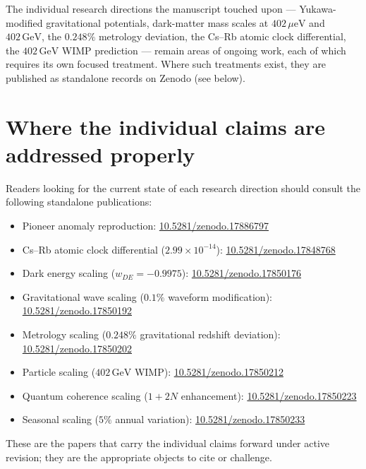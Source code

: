 \documentclass[11pt,a4paper]{article}
\begin{document}
The individual research directions the manuscript touched upon --- Yukawa-modified gravitational potentials, dark-matter mass scales at $402\,\mu\text{eV}$ and $402\,\text{GeV}$, the $0.248\%$ metrology deviation, the Cs--Rb atomic clock differential, the $402\,\text{GeV}$ WIMP prediction --- remain areas of ongoing work, each of which requires its own focused treatment. Where such treatments exist, they are published as standalone records on Zenodo (see below).

\section*{Where the individual claims are addressed properly}

Readers looking for the current state of each research direction should consult the following standalone publications:

\begin{itemize}
    \item Pioneer anomaly reproduction: \href{https://doi.org/10.5281/zenodo.17886797}{10.5281/zenodo.17886797}
    \item Cs--Rb atomic clock differential ($2.99\times 10^{-14}$): \href{https://doi.org/10.5281/zenodo.17848768}{10.5281/zenodo.17848768}
    \item Dark energy scaling ($w_{DE} = -0.9975$): \href{https://doi.org/10.5281/zenodo.17850176}{10.5281/zenodo.17850176}
    \item Gravitational wave scaling ($0.1\%$ waveform modification): \href{https://doi.org/10.5281/zenodo.17850192}{10.5281/zenodo.17850192}
    \item Metrology scaling ($0.248\%$ gravitational redshift deviation): \href{https://doi.org/10.5281/zenodo.17850202}{10.5281/zenodo.17850202}
    \item Particle scaling ($402\,\text{GeV}$ WIMP): \href{https://doi.org/10.5281/zenodo.17850212}{10.5281/zenodo.17850212}
    \item Quantum coherence scaling ($1+2N$ enhancement): \href{https://doi.org/10.5281/zenodo.17850223}{10.5281/zenodo.17850223}
    \item Seasonal scaling ($5\%$ annual variation): \href{https://doi.org/10.5281/zenodo.17850233}{10.5281/zenodo.17850233}
\end{itemize}

These are the papers that carry the individual claims forward under active revision; they are the appropriate objects to cite or challenge.
\end{document}
